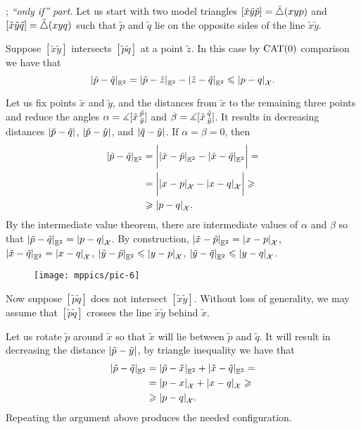 \parbf{\ref{ex:sba-2+2-short}}; \textit{``only if'' part.}
Let us start with two model triangles $[\tilde x\tilde y\tilde p]=\tilde\triangle(xyp)$ and $[\tilde x\tilde y\tilde q]=\tilde\triangle(xyq)$ such that $\tilde p$ and $\tilde q$ lie on the opposite sides of the line $\tilde x\tilde y$.

Suppose $[\tilde x \tilde y]$ intersects $[\tilde p\tilde q]$ at a point $\tilde z$.
In this case by $\mathrm{CAT}(0)$ comparison we have that
\[\dist{\tilde p}{\tilde q}{\EE^2}=\dist{\tilde p}{\tilde z}{\EE^2}-\dist{\tilde z}{\tilde q}{\EE^2}\le \dist{p}{q}{\spc{X}}.\]

Let us fix points $\tilde x$ and $\tilde y$, and the distances from $\tilde x$ to the remaining three points and reduce the angles $\alpha=\measuredangle[\tilde x\,{}^{\tilde p}_{\tilde y}]$ and $\beta=\measuredangle[\tilde x\,{}^{\tilde q}_{\tilde y}]$.
It results in decreasing distances $\dist{\tilde p}{\tilde q}{}$, $\dist{\tilde p}{\tilde y}{}$, and $\dist{\tilde q}{\tilde y}{}$.
If $\alpha=\beta=0$, then 
\begin{align*}
\dist{\tilde p}{\tilde q}{\EE^2}&=
\biggl|\dist{\tilde x}{\tilde p}{\EE^2}-\dist{\tilde x}{\tilde q}{\EE^2}\biggr|=
\\
&=\biggl|\dist{ x}{ p}{\spc{X}}-\dist{ x}{ q}{\spc{X}}\biggr|\ge
\\
&\ge\dist{p}{q}{\spc{X}}.
\end{align*}
By the intermediate value theorem, there are intermediate values of $\alpha$ and $\beta$ so that $\dist{\tilde p}{\tilde q}{\EE^2}\z=\dist{p}{q}{\spc{X}}$.
By construction, $\dist{\tilde x}{\tilde p}{\EE^2}=\dist{x}{p}{\spc{X}}$, $\dist{\tilde x}{\tilde q}{\EE^2}=\dist{x}{q}{\spc{X}}$, $\dist{\tilde y}{\tilde p}{\EE^2}\le\dist{y}{p}{\spc{X}}$, $\dist{\tilde y}{\tilde q}{\EE^2}\le\dist{y}{q}{\spc{X}}$.

\begin{wrapfigure}{o}{30 mm}
\vskip-0mm
\centering
\texttt{[image: mppics/pic-6]}
\end{wrapfigure}

Now suppose $[\tilde p \tilde q]$ does not intersect $[\tilde x\tilde y]$.
Without loss of generality, we may assume that $[\tilde p \tilde q]$ crosses the line $\tilde x\tilde y$ behind $\tilde x$.

Let us rotate $\tilde p$ around $\tilde x$ so that $\tilde x$ will lie between $\tilde p$ and $\tilde q$.
It will result in decreasing the distance $\dist{\tilde p}{\tilde y}{}$,
by triangle inequality we have that 
\begin{align*}
\dist{\tilde p}{\tilde q}{\EE^2}&=\dist{\tilde p}{\tilde x}{\EE^2}+\dist{\tilde x}{\tilde q}{\EE^2}=
\\
&=\dist{p}{x}{\spc{X}}+\dist{x}{q}{\spc{X}}\ge
\\
&\ge \dist{p}{q}{\spc{X}}.
\end{align*}
Repeating the argument above produces the needed configuration.

